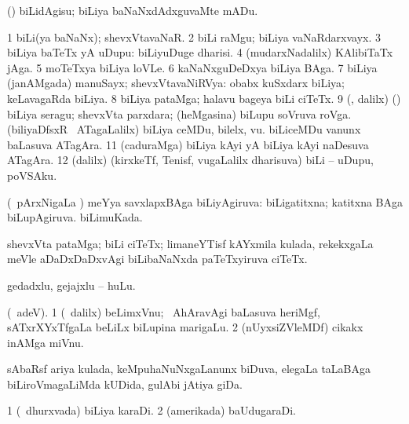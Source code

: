 \bentry
{} 
\gl{\sakirx}
\expl{}
\bmng
(\pArxparx) biLidAgisu; biLiya baNaNxdAdxguvaMte mADu. 
\emng
\eentry

\bentry
{} 
\gl{\nA}
\expl{}
\bmng
\bnum
\num{1} biLi(ya baNaNx); shevxVtavaNaR. 
\num{2} biLi raMgu; biLiya vaNaRdarxvayx. 
\num{3} biLiya baTeTx yA uDupu:  biLiyuDuge dharisi. 
\num{4} (mudarxNadalilx) KAlibiTaTx jAga. 
\num{5} moTeTxya biLiya loVLe. 
\num{6} kaNaNxguDeDxya biLiya BAga. 
\num{7}  biLiya (janAMgada) manuSayx; shevxVtavaNiRVya:  obabx kuSxdarx biLiya; keLavagaRda biLiya. 
\num{8} biLiya pataMga; halavu bageya biLi ciTeTx. 
\num{9} (\AmA, \bava dalilx) (\veYshA) biLiya seragu; shevxVta parxdara; (heMgasina) biLupu soVruva roVga. 
 (biliyaDfsxR \mo\ ATagaLalilx) 
\banum
{} biLiya ceMDu, bilelx, \mo vu. 
 biLiceMDu \mo vanunx baLasuva ATagAra. 
\eanum
\numie
\num{11} (caduraMga) biLiya kAyi yA biLiya kAyi naDesuva ATagAra. 
\num{12} (\bava dalilx) (kirxkeTf, Tenisf, \mo vugaLalilx dharisuva) biLi -- uDupu, poVSAku. 
\enum
\emng
\eentry

\bentry
{} 
\gl{\sapUpa}
\expl{}
\bmng
(\kanmu\ pArxNigaLa \vi) meYya savxlapxBAga biLiyAgiruva:  biLigatitxna; katitxna BAga biLupAgiruva.  biLimuKada. 
\emng
\eentry

\bentry
{} 
\gl{\nA}
\expl{}
\bmng
shevxVta pataMga; biLi ciTeTx; limaneYTisf kAYxmila kulada, rekekxgaLa meVle aDaDxDaDxvAgi biLibaNaNxda paTeTxyiruva ciTeTx. 
\emng
\eentry

\bentry
{}
\gl{\nA}
\bmng
gedadxlu, gejajxlu -- huLu. 
\emng
\eentry

\bentry
{}
\gl{\nA}
\bmng
(\bava\ adeV). 
\bnum
\num{1} (\sA\ \bava dalilx) beLimxVnu; \kanmu\ AhAravAgi baLasuva heriMgf, sATxrXYxTfgaLa beLiLx biLupina marigaLu. 
\num{2} (nUyxsiZVleMDf) cikakx inAMga  miVnu. 
\enum
\emng
\eentry

\bentry
{} 
\gl{\nA}
\expl{}
\bmng
sAbaRsf ariya kulada, keMpuhaNuNxgaLanunx biDuva, elegaLa taLaBAga biLiroVmagaLiMda kUDida, gulAbi jAtiya giDa. 
\emng
\eentry

\bentry
{} 
\gl{\nA}
\expl{}
\bmng
\bnum
\num{1} (\kanu\ dhurxvada) biLiya karaDi. 
\num{2} (amerikada) baUdugaraDi. 
\enum
\emng
\eentry

